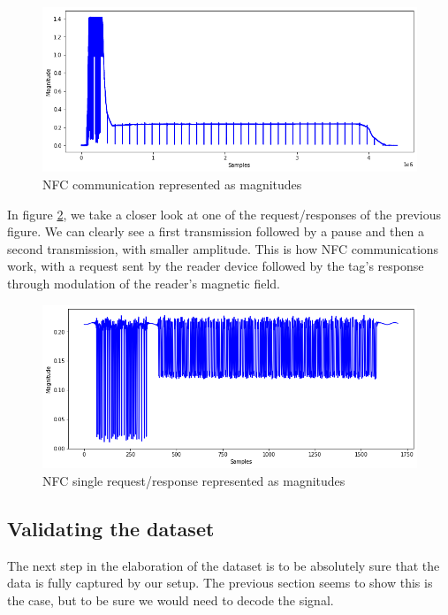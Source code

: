 \begin{figure}[htp!]
  \centering
  \includegraphics[scale=0.5]{figures/data_whole-transmission.png}
  \caption{NFC communication represented as magnitudes}
  \label{fig:nfc-full}
\end{figure}

In figure \ref{fig:nfc-single}, we take a closer look at one of the request/responses of the previous figure. We can clearly see a first transmission followed by a pause and then a second transmission, with smaller amplitude. This is how NFC communications work, with a request sent by the reader device followed by the tag's response through modulation of the reader's magnetic field.

\begin{figure}[htp!]
  \centering
  \includegraphics[scale=0.5]{figures/data_single-request-response.png}
  \caption{NFC single request/response represented as magnitudes}
  \label{fig:nfc-single}
\end{figure}

\subsection{Validating the dataset} \label{validation}

The next step in the elaboration of the dataset is to be absolutely sure that the data is fully captured by our setup. The previous section seems to show this is the case, but to be sure we would need to decode the signal.


